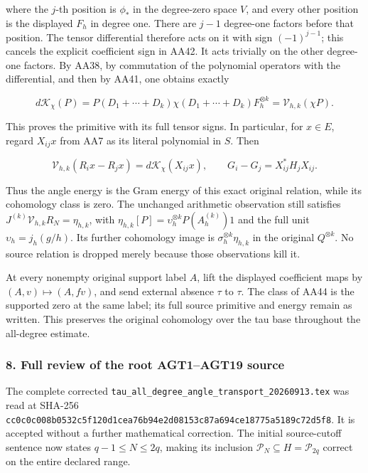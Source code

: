where the \(j\)-th position is \(\phi_*\) in the degree-zero space \(V\), and every other position is the displayed \(F_h\) in degree one. There are \(j-1\) degree-one factors before that position. The tensor differential therefore acts on it with sign \((-1)^{j-1}\); this cancels the explicit coefficient sign in AA42. It acts trivially on the other degree-one factors. By AA38, by commutation of the polynomial operators with the differential, and then by AA41, one obtains exactly

\[
d\mathcal K_\chi(P)
=P(D_1+\cdots+D_k)\chi(D_1+\cdots+D_k)F_h^{\otimes k}
=\mathcal V_{h,k}(\chi P).
\tag{AA43}
\]

This proves the primitive with its full tensor signs. In particular, for \(x\in E\), regard \(X_{ij}x\) from AA7 as its literal polynomial in \(S\). Then

\[
\mathcal V_{h,k}(R_ix-R_jx)
=d\mathcal K_\chi(X_{ij}x),\qquad
G_i-G_j=X_{ij}^*H_jX_{ij}.
\tag{AA44}
\]

Thus the angle energy is the Gram energy of this exact original relation, while its cohomology class is zero. The unchanged arithmetic observation still satisfies \(J^{(k)}\mathcal V_{h,k}R_N=\eta_{h,k}\), with \(\eta_{h,k}[P]=\upsilon_h^{\otimes k}P(A_h^{(k)})1\) and the full unit \(\upsilon_h=j_h(g/h)\). Its further cohomology image is \(\sigma_h^{\otimes k}\eta_{h,k}\) in the original \(Q^{\otimes k}\). No source relation is dropped merely because those observations kill it.

At every nonempty original support label \(A\), lift the displayed coefficient maps by \((A,v)\mapsto(A,fv)\), and send external absence \(\tau\) to \(\tau\). The class of AA44 is the supported zero at the same label; its full source primitive and energy remain as written. This preserves the original cohomology over the tau base throughout the all-degree estimate.

\subsubsection{8. Full review of the root AGT1--AGT19 source}\label{endpoint-all_degree_angle_review--full-review-of-the-root-agt1agt19-source}

The complete corrected \nolinkurl{tau_all_degree_angle_transport_20260913.tex} was read at SHA-256 \nolinkurl{cc0c0c008b0532c5f120d1cea76b94e2d08153c87a694ce18775a5189c72d5f8}. It is accepted without a further mathematical correction. The initial source-cutoff sentence now states \(q-1\le N\le2q\), making its inclusion \(\mathcal P_N\subseteq H=\mathcal P_{2q}\) correct on the entire declared range.

